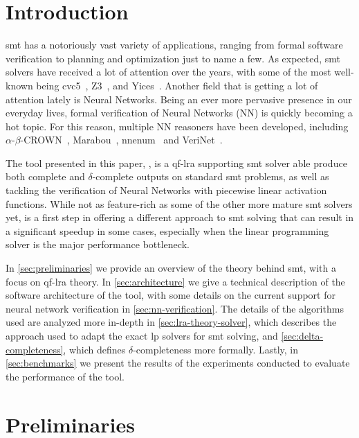 \documentclass[runningheads]{llncs}
\begin{document}
\section{Introduction}

\gls{smt} has a notoriously vast variety of applications, ranging from formal software verification to planning and optimization just to name a few.
As expected, \gls{smt} solvers have received a lot of attention over the years, with some of the most well-known being cvc5~\cite{ref:cvc5}, Z3~\cite{ref:z3}, and Yices~\cite{ref:yices}.
Another field that is getting a lot of attention lately is Neural Networks.
Being an ever more pervasive presence in our everyday lives, formal verification of Neural Networks (NN) is quickly becoming a hot topic.
For this reason, multiple NN reasoners have been developed, including $\alpha$-$\beta$-CROWN~\cite{ref:a-crown,ref:b-crown,ref:crown,ref:lirpa}, Marabou~\cite{ref:marabou}, nnenum~\cite{ref:nnenum} and VeriNet~\cite{ref:verinet}.

The tool presented in this paper, \dlinear, is a \gls{qf-lra} supporting \gls{smt} solver able produce both complete and $\delta$-complete outputs on standard \gls{smt} problems,
as well as tackling the verification of Neural Networks with piecewise linear activation functions.
While not as feature-rich as some of the other more mature \gls{smt} solvers yet, \dlinear is a first step in offering a different approach to \gls{smt} solving that can result in a significant speedup in some cases, especially when the linear programming solver is the major performance bottleneck.

In \autoref{sec:preliminaries} we provide an overview of the theory behind \gls{smt}, with a focus on \gls{qf-lra} theory.
In \autoref{sec:architecture} we give a technical description of the software architecture of the tool, with some details on the current support for neural network verification in \autoref{sec:nn-verification}.
The details of the algorithms used are analyzed more in-depth in \autoref{sec:lra-theory-solver}, which describes the approach used to adapt the exact \gls{lp} solvers for \gls{smt} solving, and \autoref{sec:delta-completeness}, which defines $\delta$-completeness more formally.
Lastly, in \autoref{sec:benchmarks} we present the results of the experiments conducted to evaluate the performance of the tool.

\section{Preliminaries}
\label{sec:preliminaries}
\end{document}
